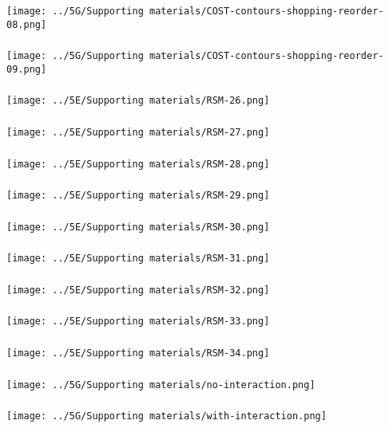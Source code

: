 \begin{frame}\frametitle{}
	\centerline{\texttt{[image: ../5G/Supporting materials/COST-contours-shopping-reorder-08.png]}}
\end{frame}
\begin{frame}\frametitle{}
	\centerline{\texttt{[image: ../5G/Supporting materials/COST-contours-shopping-reorder-09.png]}}
\end{frame}
\begin{frame}\frametitle{}
	\centerline{\texttt{[image: ../5E/Supporting materials/RSM-26.png]}}
\end{frame}
\begin{frame}\frametitle{}
	\centerline{\texttt{[image: ../5E/Supporting materials/RSM-27.png]}}
\end{frame}
\begin{frame}\frametitle{}
	\centerline{\texttt{[image: ../5E/Supporting materials/RSM-28.png]}}
\end{frame}
\begin{frame}\frametitle{}
	\centerline{\texttt{[image: ../5E/Supporting materials/RSM-29.png]}}
\end{frame}
\begin{frame}\frametitle{}
	\centerline{\texttt{[image: ../5E/Supporting materials/RSM-30.png]}}
\end{frame}
\begin{frame}\frametitle{}
	\centerline{\texttt{[image: ../5E/Supporting materials/RSM-31.png]}}
\end{frame}
\begin{frame}\frametitle{}
	\centerline{\texttt{[image: ../5E/Supporting materials/RSM-32.png]}}
\end{frame}
\begin{frame}\frametitle{}
	\centerline{\texttt{[image: ../5E/Supporting materials/RSM-33.png]}}
\end{frame}
\begin{frame}\frametitle{}
	\centerline{\texttt{[image: ../5E/Supporting materials/RSM-34.png]}}
\end{frame}
\begin{frame}\frametitle{}
	\centerline{\texttt{[image: ../5G/Supporting materials/no-interaction.png]}}
\end{frame}
\begin{frame}\frametitle{}
	\centerline{\texttt{[image: ../5G/Supporting materials/with-interaction.png]}}
\end{frame}

